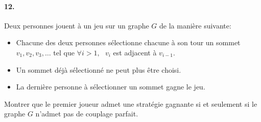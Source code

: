 
%
%
%
%
%
%
%
%


\paragraph{12. } Deux personnes jouent à un jeu sur un graphe $G$ de la manière suivante: \\

\begin{itemize}
  \item Chacune des deux personnes sélectionne chacune à son tour un sommet $v_1, v_2, v_3, …$ tel que $\forall i > 1, \ \ \ v_i$ est adjacent à $v_{i-1}$.
  \item Un sommet déjà sélectionné ne peut plus être choisi.
  \item La dernière personne à sélectionner un sommet gagne le jeu.
\end{itemize}

Montrer que le premier joueur admet une stratégie gagnante si et seulement si le graphe $G$ n'admet pas de couplage parfait.
